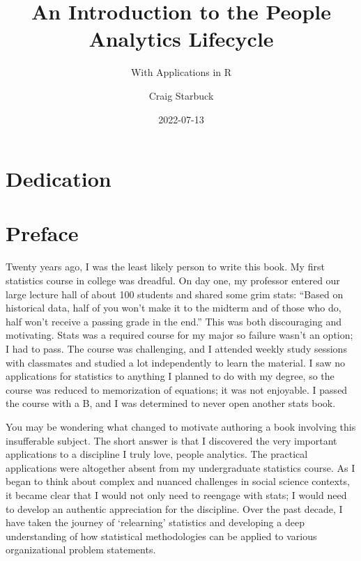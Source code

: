 \documentclass[
]{book}
\title{An Introduction to the People Analytics Lifecycle}
\subtitle{With Applications in R}
\author{Craig Starbuck}
\date{2022-07-13}
\begin{document}
\maketitle

{
\setcounter{tocdepth}{1}
\tableofcontents
}
\hypertarget{dedication}{%
\chapter*{Dedication}\label{dedication}}

\hypertarget{preface}{%
\chapter*{Preface}\label{preface}}

Twenty years ago, I was the least likely person to write this book. My first statistics course in college was dreadful. On day one, my professor entered our large lecture hall of about 100 students and shared some grim stats: ``Based on historical data, half of you won't make it to the midterm and of those who do, half won't receive a passing grade in the end.'' This was both discouraging and motivating. Stats was a required course for my major so failure wasn't an option; I had to pass. The course was challenging, and I attended weekly study sessions with classmates and studied a lot independently to learn the material. I saw no applications for statistics to anything I planned to do with my degree, so the course was reduced to memorization of equations; it was not enjoyable. I passed the course with a B, and I was determined to never open another stats book.

You may be wondering what changed to motivate authoring a book involving this insufferable subject. The short answer is that I discovered the very important applications to a discipline I truly love, people analytics. The practical applications were altogether absent from my undergraduate statistics course. As I began to think about complex and nuanced challenges in social science contexts, it became clear that I would not only need to reengage with stats; I would need to develop an authentic appreciation for the discipline. Over the past decade, I have taken the journey of `relearning' statistics and developing a deep understanding of how statistical methodologies can be applied to various organizational problem statements.
\end{document}

